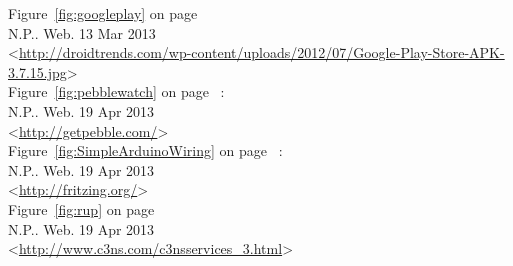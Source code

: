 \begin{thebibliography}{19}
	Figure~\ref{fig:googleplay} on page~\pageref{fig:googleplay} \\
	N.P.. Web. 13 Mar 2013\\
	<\url{http://droidtrends.com/wp-content/uploads/2012/07/Google-Play-Store-APK-3.7.15.jpg}> \\

	Figure~\ref{fig:pebblewatch} on page~\pageref{fig:pebblewatch} : \\
	N.P.. Web. 19 Apr 2013\\
	<\url{http://getpebble.com/}> \\

	Figure~\ref{fig:SimpleArduinoWiring} on page~\pageref{fig:SimpleArduinoWiring} : \\
	N.P.. Web. 19 Apr 2013\\
	<\url{http://fritzing.org/}> \\

	Figure~\ref{fig:rup} on page~\pageref{fig:rup} \\
	N.P.. Web. 19 Apr 2013\\
	<\url{http://www.c3ns.com/c3nsservices_3.html}> \\
	
\end{thebibliography}
